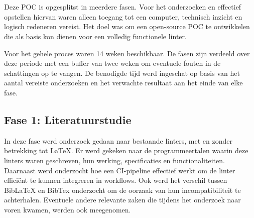 
\chapter{}%
\label{ch:methodologie}

Deze \acrlong{POC} is opgesplitst in meerdere fasen. Voor het onderzoeken en effectief opstellen hiervan waren alleen toegang tot een computer, technisch inzicht en logisch redeneren vereist. Het doel was om een open-source \acrlong{POC} te ontwikkelen die als basis kon dienen voor een volledig functionele linter.

Voor het gehele proces waren 14 weken beschikbaar. De fasen zijn verdeeld over deze periode met een buffer van twee weken om eventuele fouten in de schattingen op te vangen. De benodigde tijd werd ingeschat op basis van het aantal vereiste onderzoeken en het verwachte resultaat aan het einde van elke fase.

\section{Fase 1: Literatuurstudie}
In deze fase werd onderzoek gedaan naar bestaande linters, met en zonder betrekking tot \LaTeX{}. Er werd gekeken naar de programmeertalen waarin deze linters waren geschreven, hun werking, specificaties en functionaliteiten. Daarnaast werd onderzocht hoe een \acrshort{CI}-pipeline effectief werkt om de linter efficiënt te kunnen integreren in workflows. Ook werd het verschil tussen BibLaTeX en BibTex onderzocht om de oorzaak van hun incompatibiliteit te achterhalen. Eventuele andere relevante zaken die tijdens het onderzoek naar voren kwamen, werden ook meegenomen.

